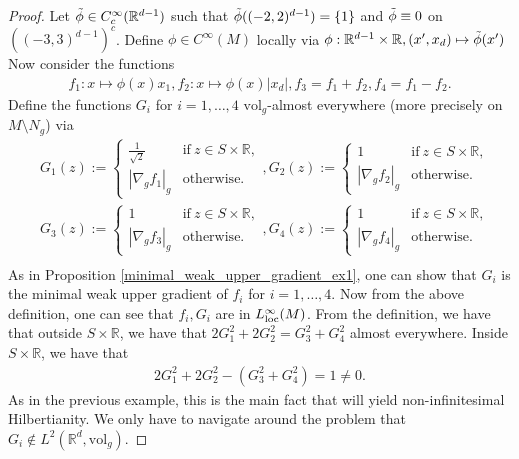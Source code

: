 \documentclass[a4paper,10pt]{article}
\numberwithin{equation}{section}
\newcommand{\R}{\mathbb{R}}
\newcommand{\vol}{\mathrm{vol}}
\begin{document}
\begin{proof}
Let $\Tilde{\phi} \in C_c^\infty(\R^{d-1})$ such that $\Tilde \phi((-2, 2)^{d-1}) = \{1\}$ and $\Tilde \phi \equiv 0$ on $((-3, 3)^{d-1})^c$. Define $\phi \in C^\infty(M)$ locally via $\phi: \R^{d-1} \times \R, (x', x_d) \mapsto \Tilde \phi (x')$ 
Now consider the functions 
\begin{align*}
    f_1: x \mapsto \phi(x) x_1, f_2: x \mapsto \phi(x) |x_d|, f_3 = f_1+f_2, f_4 = f_1-f_2. 
\end{align*}
Define the functions $G_i$ for $i =1,\ldots, 4$ $\vol_g$-almost everywhere (more precisely on $M\setminus N_g$) via 
\begin{align*}
    &G_1(z):= \left\{ \begin{array}{ll}
           \frac{1}{\sqrt{2}} & \mathrm{if}\ z \in S \times \R, \\
           |\nabla_g f_1|_{g} & \mathrm{otherwise}.
        \end{array}\right. ,G_2(z):= \left\{ \begin{array}{ll}
           1 & \mathrm{if}\ z \in S \times \R, \\
           |\nabla_g f_2|_{g}  & \mathrm{otherwise}.
        \end{array}\right. \\
        &G_3(z):= \left\{ \begin{array}{ll}
           1 & \mathrm{if}\ z \in S \times \R, \\
           |\nabla_g f_3|_{g}  & \mathrm{otherwise}.
        \end{array}\right. ,G_4(z):= \left\{ \begin{array}{ll}
           1 & \mathrm{if}\ z \in S \times \R, \\
           |\nabla_g f_4|_{g} & \mathrm{otherwise}.
        \end{array}\right. \\
\end{align*}
As in Proposition \ref{minimal_weak_upper_gradient_ex1}, one can show that $G_i$ is the minimal weak upper gradient of $f_i$ for $i=1, \ldots, 4$.
Now from the above definition, one can see that $f_i, G_i$ are in $L^\infty_{\rm loc}(M)$. From the definition, we have that outside $S \times \R$, we have that $2G_1^2+2G_2^2= G_3^2+G_4^2$ almost everywhere. Inside $S \times \R$, we have that 
\begin{align}\label{non-quadratic_cheegers}
  2G_1^2+2G_2^2-  (G_3^2+G_4^2) =1 \neq 0.  
\end{align}
As in the previous example, this is the main fact that will yield non-infinitesimal Hilbertianity. We only have to navigate around the problem that $G_i \notin L^2(\R^d,\vol_g)$. 

\end{proof}
\end{document}
